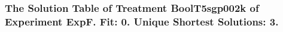  \begin{frame}
 \fontsize{8pt}{9pt}\selectfont
 \frametitle{ The Solution Table of Treatment BoolT5sgp002k of Experiment ExpF. Fit: 0. Unique Shortest Solutions: 3. }

 \label{ExpFSolutionTable000.tex}  
 \end{frame}

